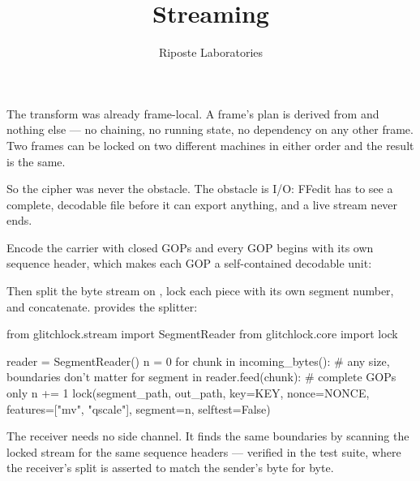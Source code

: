 \documentclass[fontpath=fonts/,logopath=logo/]{riposte-doc}
\title{Streaming}
\author{Riposte Laboratories}
\date{}
\begin{document}
\ripmakehead

\riptoc



The transform was already frame-local. A frame's plan is derived from  and nothing else — no chaining, no running state, no dependency on any other frame. Two frames can be locked on two different machines in either order and the result is the same.

So the cipher was never the obstacle. The obstacle is I/O: FFedit has to see a complete, decodable file before it can export anything, and a live stream never ends.



Encode the carrier with closed GOPs and every GOP begins with its own sequence header, which makes each GOP a self-contained decodable unit:

\ripcodeopen
{}
\ripcodesizereset\ripcodeclose

Then split the byte stream on , lock each piece with its own segment number, and concatenate.  provides the splitter:

\ripcodeopen
{}
\begin{ripcodeblock}
from glitchlock.stream import SegmentReader
from glitchlock.core import lock

reader = SegmentReader()
n = 0
for chunk in incoming_bytes():           # any size, boundaries don't matter
    for segment in reader.feed(chunk):   # complete GOPs only
        n += 1
        lock(segment_path, out_path, key=KEY, nonce=NONCE,
             features=["mv", "qscale"], segment=n, selftest=False)
\end{ripcodeblock}
\ripcodesizereset\ripcodeclose

The receiver needs no side channel. It finds the same boundaries by scanning the locked stream for the same sequence headers — verified in the test suite, where the receiver's split is asserted to match the sender's byte for byte.


\end{document}
